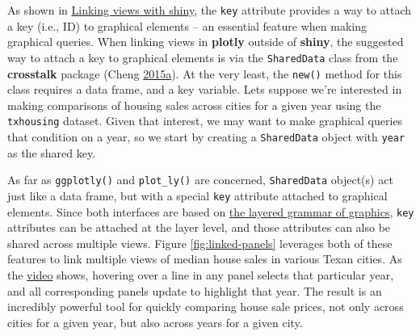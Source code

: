 \documentclass[12pt,]{isuthesis}
\newenvironment{Shaded}{\begin{snugshade}}{\end{snugshade}}
\newcommand{\KeywordTok}[1]{\textcolor[rgb]{0.13,0.29,0.53}{\textbf{{#1}}}}
\newcommand{\StringTok}[1]{\textcolor[rgb]{0.31,0.60,0.02}{{#1}}}
\newcommand{\CommentTok}[1]{\textcolor[rgb]{0.56,0.35,0.01}{\textit{{#1}}}}
\newcommand{\NormalTok}[1]{{#1}}
\begin{document}
As shown in \protect\hyperlink{linking-views-with-shiny}{Linking views
with shiny}, the \texttt{key} attribute provides a way to attach a key
(i.e., ID) to graphical elements -- an essential feature when making
graphical queries. When linking views in \textbf{plotly} outside of
\textbf{shiny}, the suggested way to attach a key to graphical elements
is via the \texttt{SharedData} class from the \textbf{crosstalk} package
(Cheng
\protect\hyperlink{ref-crosstalk}{2015}\protect\hyperlink{ref-crosstalk}{a}).
At the very least, the \texttt{new()} method for this class requires a
data frame, and a key variable. Lets suppose we're interested in making
comparisons of housing sales across cities for a given year using the
\texttt{txhousing} dataset. Given that interest, we may want to make
graphical queries that condition on a year, so we start by creating a
\texttt{SharedData} object with \texttt{year} as the shared key.

\begin{Shaded}
\end{Shaded}

As far as \texttt{ggplotly()} and \texttt{plot\_ly()} are concerned,
\texttt{SharedData} object(s) act just like a data frame, but with a
special \texttt{key} attribute attached to graphical elements. Since
both interfaces are based on
\protect\hyperlink{the-layered-grammar-of-graphics}{the layered grammar
of graphics}, \texttt{key} attributes can be attached at the layer
level, and those attributes can also be shared across multiple views.
Figure \ref{fig:linked-panels} leverages both of these features to link
multiple views of median house sales in various Texan cities. As the
\href{http://i.imgur.com/DdPdSBB.gif}{video} shows, hovering over a line
in any panel selects that particular year, and all corresponding panels
update to highlight that year. The result is an incredibly powerful tool
for quickly comparing house sale prices, not only across cities for a
given year, but also across years for a given city.
\end{document}
